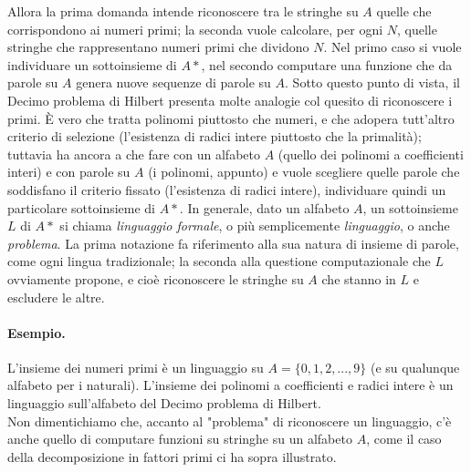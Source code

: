 Allora la prima domanda intende riconoscere tra le stringhe su $A$
quelle che corrispondono ai numeri primi; la seconda vuole calcolare,
per ogni $N$, quelle stringhe
che rappresentano numeri primi che dividono $N$.
Nel primo caso si vuole individuare un sottoinsieme di $A*$, nel secondo
computare una funzione che da parole
su $A$ genera nuove sequenze di parole su $A$. Sotto questo punto di vista,
il Decimo problema di Hilbert presenta molte analogie col quesito di riconoscere
i primi. È vero che tratta polinomi piuttosto che
numeri, e che adopera tutt'altro criterio di selezione
(l'esistenza di radici intere piuttosto che la primalità);
tuttavia ha ancora a che fare con un alfabeto $A$
(quello dei polinomi a coefficienti interi) e con parole su $A$
(i polinomi, appunto) e vuole scegliere quelle parole che soddisfano il criterio
fissato (l'esistenza di radici intere),
individuare quindi un particolare sottoinsieme di $A*$.
In generale, dato un alfabeto $A$, un sottoinsieme $L$ di $A*$ si chiama \textit{linguaggio
    formale}, o più semplicemente \textit{linguaggio}, o anche \textit{problema}.
La prima notazione fa riferimento alla sua natura di insieme di parole,
come ogni lingua tradizionale; la seconda alla questione computazionale che $L$
ovviamente propone, e cioè
riconoscere le stringhe su $A$ che stanno in $L$ e escludere le altre.

\paragraph{Esempio.}
L'insieme dei numeri primi è un linguaggio su $A = \{0, 1, 2, ..., 9\}$
(e su qualunque alfabeto per i naturali). L'insieme dei polinomi a coefficienti e
radici intere è un linguaggio sull'alfabeto del Decimo problema di Hilbert.\\

Non dimentichiamo che, accanto al "problema" di riconoscere un linguaggio, c'è
anche quello di computare funzioni su stringhe su un alfabeto $A$, come il caso
della decomposizione in fattori primi ci ha sopra illustrato.